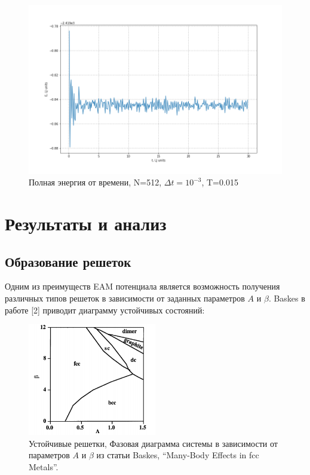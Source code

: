 \documentclass[12pt]{article}
\begin{document}
\begin{figure}[h]
\centering
\includegraphics[width=1.0\textwidth]{energy1}
\caption{Полная энергия от времени, N=512, $\Delta t = 10^{-3}$, T=0.015}
\end{figure}
\FloatBarrier

\section{Результаты и анализ}
\subsection{Образование решеток}
Одним из преимуществ EAM потенциала является возможность получения различных типов решеток в зависимости от заданных параметров $A$ и $\beta$. Baskes в работе [2] приводит диаграмму устойчивых состояний: 
\begin{figure}[h]
\centering
\includegraphics[width=0.5\textwidth]{phases_baskes}
\caption{Устойчивые решетки, Фазовая диаграмма системы в зависимости от параметров $A$ и $\beta$ из статьи Baskes, “Many-Body Effects in fcc Metals”.}
\end{figure}
\FloatBarrier
\end{document}
